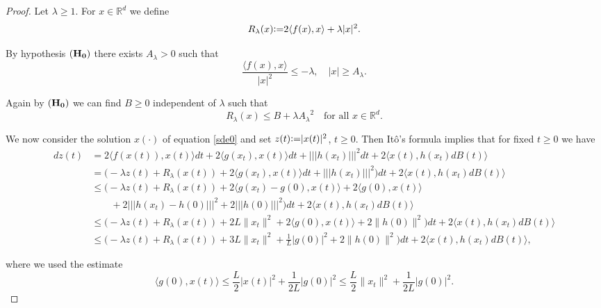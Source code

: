 \documentclass[11pt,reqno,draft]{amsart}
\begin{document}
\begin{proof}
\noindent Let $\lambda \ge 1$. For $x\in {\mathbb R}^d$ we define
$$
R_{\lambda}(x){\mathrel{\mathrm{\raise0.1ex\hbox{:}\hbox{=}\strut}}} 2{\langle} f(x),x{\rangle}+\lambda |x|^2.
$$

\noindent  By hypothesis ${\bf (H_0)}$ there exists ${A_{\lambda}}>0$ such that
$$
\frac{{\langle} f(x),x{\rangle}}{|x|^2}\leq -\lambda,\quad |x|\geq {A_{\lambda}}.
$$

\noindent Again by ${\bf (H_0)}$ we can find $B\geq 0$ independent
of $\lambda$ such that
\begin{equation}\label{R-estimate}
R_{\lambda}(x)\leq B+\lambda {A_{\lambda}}^2\quad\mbox{for all $x\in {\mathbb R}^d$} .
\end{equation}

\noindent We now consider the solution $x(\cdot)$ of equation
\eqref{sde0} and  set $z(t){\mathrel{\mathrm{\raise0.1ex\hbox{:}\hbox{=}\strut}}} |x(t)|^2$, $t\geq 0$. Then
It\^{o}'s formula implies that for fixed $t\geq 0$ we have
\begin{equation}
\begin{split}
dz(t)&=2{\langle} f(x(t)),x(t){\rangle} dt+2{\langle} g(x_t),x(t){\rangle} dt+{|\!|\!|{h(x_t)}|\!|\!|}^2
dt+2{\langle} x(t),h(x_t)dB(t){\rangle}\\
&=\Big( -\lambda z(t)+R_{\lambda}(x(t))+2{\langle} g(x_t),x(t){\rangle}
dt+{|\!|\!|{h(x_t)}|\!|\!|}^2\Big) dt+2{\langle} x(t),h(x_t)dB(t){\rangle}\\
&\leq\Big( -\lambda z(t)+R_{\lambda}(x(t))+2{\langle}
g(x_t)-g(0),x(t){\rangle}+2{\langle}
g(0),x(t){\rangle}\\&\qquad+2{|\!|\!|{h(x_t)-h(0)}|\!|\!|}^2+2{|\!|\!|{h(0)}|\!|\!|}^2\Big)dt+2{\langle} x(t),h(x_t)dB(t){\rangle}\\
&\leq \Big( -\lambda z(t)+R_{\lambda}(x(t))+2L\|x_t\|^2+2{\langle}
g(0),x(t){\rangle}+2\|h(0)\|^2\Big)dt+2{\langle} x(t),h(x_t)dB(t){\rangle}\\
&\leq   \Big(-\lambda z(t)+R_{\lambda}(x(t))+3L\|x_t\|^2+\frac
1L|g(0)|^2+2\|h(0)\|^2\Big)dt+2{\langle} x(t),h(x_t)dB(t){\rangle},
\end{split}
\end{equation}

\noindent where we used the estimate $${\langle} g(0),x(t){\rangle}\leq
\frac{L}{2}|x(t)|^2+\frac{1}{2L}|g(0)|^2\leq
\frac{L}{2}\|x_t\|^2+\frac{1}{2L}|g(0)|^2.$$

\noindent


\end{proof}
\end{document}

